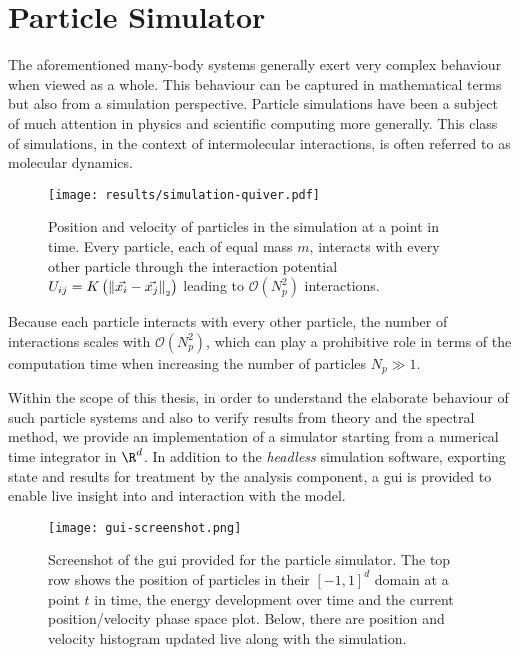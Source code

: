 \chapter{Particle Simulator}
\label{chap:particle-simulator}

The aforementioned many-body systems generally exert very complex behaviour when viewed as a whole.
This behaviour can be captured in mathematical terms but also from a simulation perspective.
Particle simulations have been a subject of much attention in physics and scientific computing more generally.
This class of simulations, in the context of intermolecular interactions, is often referred to as molecular dynamics.

\begin{figure}[H]
  \centering
  \label{fig:simulation-quiver}
  \texttt{[image: results/simulation-quiver.pdf]}
  \caption{Position and velocity of particles in the simulation at a point in time. Every particle, each of equal mass $m$, interacts with every other particle through the interaction potential $U_{ij} = K\left(\left\lVert\vec{x_i} - \vec{x_j}\right\rVert_{\scriptscriptstyle 2}\right)$ leading to $\mathcal{O}(N_p^2)$ interactions.}
\end{figure}

Because each particle interacts with every other particle, the number of interactions scales with $\mathcal{O}(N_p^2)$,
which can play a prohibitive role in terms of the computation time when increasing the number of particles $N_p \gg 1$.

Within the scope of this thesis, in order to understand the elaborate behaviour of such particle systems and also to verify results from theory and the spectral method, we provide an implementation of a simulator starting from a numerical time integrator in $\R^d$.
In addition to the \textit{headless} simulation software, exporting state and results for treatment by the analysis component, a \gls{gui} is provided to enable live insight into and interaction with the model.

\begin{figure}[H]
  \centering
  \label{fig:gui-screenshot}
  \texttt{[image: gui-screenshot.png]}
  \caption{Screenshot of the \gls{gui} provided for the particle simulator. The top row shows the position of particles in their $[-1, 1]^d$ domain at a point $t$ in time, the energy development over time and the current position/velocity phase space plot. Below, there are position and velocity histogram updated live along with the simulation.}
\end{figure}

